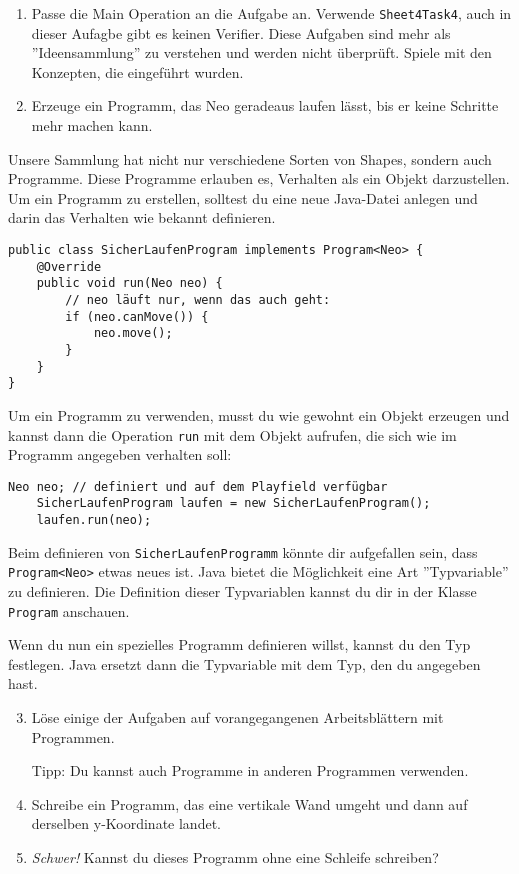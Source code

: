 
\begin{enumerate}
	\item Passe die Main Operation an die Aufgabe an.
		Verwende \lstinline{Sheet4Task4}, auch in dieser Aufagbe gibt es keinen Verifier.
		Diese Aufgaben sind mehr als ''Ideensammlung'' zu verstehen und werden nicht überprüft.
		Spiele mit den Konzepten, die eingeführt wurden.
	\item Erzeuge ein Programm, das Neo geradeaus laufen lässt, bis er keine Schritte mehr machen kann.
\end{enumerate}

\begin{Infobox}[Programme]
	Unsere Sammlung hat nicht nur verschiedene Sorten von Shapes, sondern auch Programme.
	Diese Programme erlauben es, Verhalten als ein Objekt darzustellen.
	Um ein Programm zu erstellen, solltest du eine neue Java-Datei anlegen und darin das Verhalten wie bekannt definieren.

	\begin{lstlisting}[title=SicherLaufenProgram.java, numbers=none,xleftmargin=0.5cm]
public class SicherLaufenProgram implements Program<Neo> {
	@Override
	public void run(Neo neo) {
		// neo läuft nur, wenn das auch geht:
		if (neo.canMove()) {
			neo.move();
		}
	}
}
	\end{lstlisting}

	Um ein Programm zu verwenden, musst du wie gewohnt ein Objekt erzeugen und kannst dann die Operation \lstinline{run} mit dem Objekt aufrufen, die sich wie im Programm angegeben verhalten soll:

	\begin{lstlisting}[numbers=none,xleftmargin=0.5cm]
	Neo neo; // definiert und auf dem Playfield verfügbar
	SicherLaufenProgram laufen = new SicherLaufenProgram();
	laufen.run(neo);
	\end{lstlisting}
\end{Infobox}

\begin{Infobox}
	Beim definieren von \lstinline{SicherLaufenProgramm} könnte dir aufgefallen sein, dass \mbox{\lstinline{Program<Neo>}} etwas neues ist.
	Java bietet die Möglichkeit eine Art ''Typvariable'' zu definieren.
	Die Definition dieser Typvariablen kannst du dir in der Klasse \lstinline{Program} anschauen.

	Wenn du nun ein spezielles Programm definieren willst, kannst du den Typ festlegen.
	Java ersetzt dann die Typvariable mit dem Typ, den du angegeben hast.
\end{Infobox}

\begin{enumerate}\setcounter{enumi}{2}
	\item Löse einige der Aufgaben auf vorangegangenen Arbeitsblättern mit Programmen.
	
	Tipp: Du kannst auch Programme in anderen Programmen verwenden.
	\item Schreibe ein Programm, das eine vertikale Wand umgeht und dann auf derselben y-Koordinate landet.
	\item \optional \emph{Schwer!} Kannst du dieses Programm ohne eine Schleife schreiben?
\end{enumerate}
